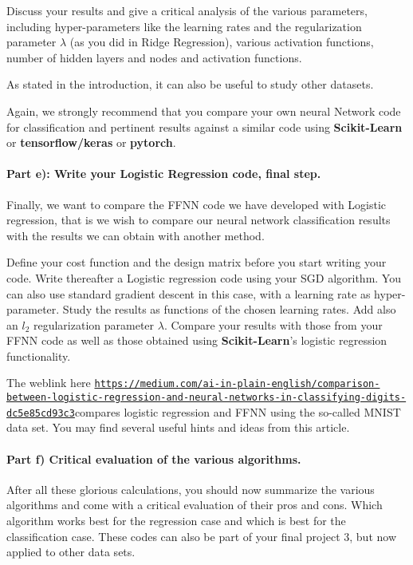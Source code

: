 \documentclass[%
oneside,                 %
final,                   %
10pt]{article}
\begin{document}
Discuss your results and give a critical analysis of the various parameters, including hyper-parameters like the learning rates and the regularization parameter $\lambda$ (as you did in Ridge Regression), various activation functions, number of hidden layers and nodes and activation functions.  

As stated in the introduction, it can also be useful to study other
datasets. 

Again, we strongly recommend that you compare your own neural Network
code for classification and pertinent results against a similar code using \textbf{Scikit-Learn}  or \textbf{tensorflow/keras} or \textbf{pytorch}.

\paragraph{Part e): Write your Logistic Regression code, final step.}
Finally, we want to compare the FFNN code we have developed with
Logistic regression, that is we wish to compare our neural network
classification results with the results we can obtain with another
method.

Define your cost function and the design matrix before you start writing your code.
Write thereafter a Logistic regression code using your SGD algorithm. You can also use standard gradient descent in this case, with a learning rate as hyper-parameter.
Study the results as functions of the chosen learning rates.
Add also an $l_2$ regularization parameter $\lambda$. Compare your results with those from your FFNN code as well as those obtained using \textbf{Scikit-Learn}'s logistic regression functionality.

The weblink  here \href{{https://medium.com/ai-in-plain-english/comparison-between-logistic-regression-and-neural-networks-in-classifying-digits-dc5e85cd93c3}}{\nolinkurl{https://medium.com/ai-in-plain-english/comparison-between-logistic-regression-and-neural-networks-in-classifying-digits-dc5e85cd93c3}}compares logistic regression and FFNN using the so-called MNIST data set. You may find several useful hints and ideas from this article. 

\paragraph{Part f) Critical evaluation of the various algorithms.}
After all these glorious calculations, you should now summarize the
various algorithms and come with a critical evaluation of their pros
and cons. Which algorithm works best for the regression case and which
is best for the classification case. These codes can also be part of
your final project 3, but now applied to other data sets.
\end{document}
